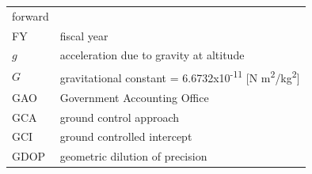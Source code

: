 \documentclass[
]{book}
\begin{document}
\begin{longtable}[]{@{}ll@{}}
\begin{minipage}[t]{0.47\columnwidth}
forward\strut
\end{minipage}\tabularnewline
\begin{minipage}[t]{0.47\columnwidth}\raggedright
FY\strut
\end{minipage} & \begin{minipage}[t]{0.47\columnwidth}\raggedright
fiscal year\strut
\end{minipage}\tabularnewline
\begin{minipage}[t]{0.47\columnwidth}\raggedright
\(g\)\strut
\end{minipage} & \begin{minipage}[t]{0.47\columnwidth}\raggedright
acceleration due to gravity at altitude\strut
\end{minipage}\tabularnewline
\begin{minipage}[t]{0.47\columnwidth}\raggedright
\(G\)\strut
\end{minipage} & \begin{minipage}[t]{0.47\columnwidth}\raggedright
gravitational constant = 6.6732x10\textsuperscript{-11} {[}N m\textsuperscript{2}/kg\textsuperscript{2}{]}\strut
\end{minipage}\tabularnewline
\begin{minipage}[t]{0.47\columnwidth}\raggedright
GAO\strut
\end{minipage} & \begin{minipage}[t]{0.47\columnwidth}\raggedright
Government Accounting Office\strut
\end{minipage}\tabularnewline
\begin{minipage}[t]{0.47\columnwidth}\raggedright
GCA\strut
\end{minipage} & \begin{minipage}[t]{0.47\columnwidth}\raggedright
ground control approach\strut
\end{minipage}\tabularnewline
\begin{minipage}[t]{0.47\columnwidth}\raggedright
GCI\strut
\end{minipage} & \begin{minipage}[t]{0.47\columnwidth}\raggedright
ground controlled intercept\strut
\end{minipage}\tabularnewline
\begin{minipage}[t]{0.47\columnwidth}\raggedright
GDOP\strut
\end{minipage} & \begin{minipage}[t]{0.47\columnwidth}\raggedright
geometric dilution of precision\strut
\end{minipage}\tabularnewline

\end{longtable}
\end{document}
